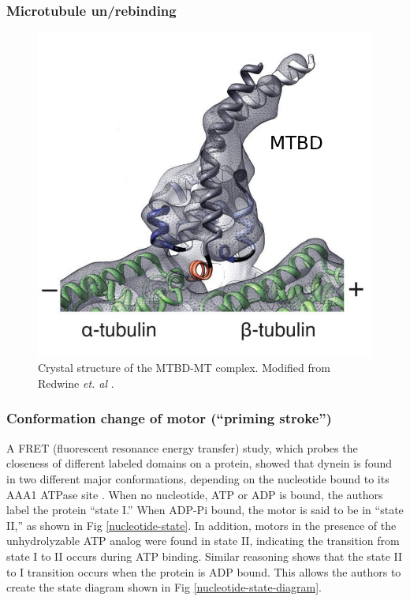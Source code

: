 \documentclass[10pt]{article} %
\begin{document}
\subsubsection{Microtubule un/rebinding}


\begin{figure}[h]
  \centering
  \includegraphics[width=.65\textwidth,keepaspectratio]{../../figures/mtbd-complex.png}
  \caption{Crystal structure of the MTBD-MT complex. Modified from Redwine \textit{et. al} \cite{redwineMTBDcomplex}.}
  \label{dynein-artist-rendition-2}
\end{figure}


\subsubsection{Conformation change of motor (``priming stroke'')}
A FRET (fluorescent resonance energy transfer) study, which probes the closeness of different labeled domains on a protein, showed that dynein is found in two different major conformations, depending on the nucleotide bound to its AAA1 ATPase site \cite{FRETstatepaper}. When no nucleotide, ATP or ADP is bound, the authors label the protein ``state I.'' When ADP-Pi bound, the motor is said to be in ``state II,'' as shown in Fig \ref{nucleotide-state}. In addition, motors in the presence of the unhydrolyzable ATP analog were found in state II, indicating the transition from state I to II occurs during ATP binding. Similar reasoning shows that the state II to I transition occurs when the protein is ADP bound. This allows the authors to create the state diagram shown in Fig \ref{nucleotide-state-diagram}.\\

\end{document}
